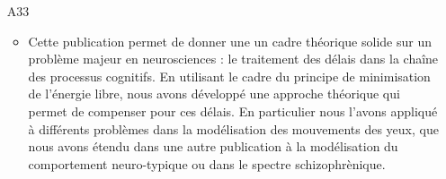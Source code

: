 \begin{enumerate}
\item[A33]  %
\begin{itemize}
  \item Cette publication permet de donner une un cadre théorique solide sur un problème majeur en neurosciences : le traitement des délais dans la chaîne des processus cognitifs. En utilisant le cadre du principe de minimisation de l'énergie libre, nous avons développé une approche théorique qui permet de compenser pour ces délais. En particulier nous l'avons appliqué à différents problèmes dans la modélisation des mouvements des yeux, que nous avons étendu dans une autre publication à la modélisation du comportement neuro-typique ou dans le spectre schizophrènique.
\end{itemize}
%
%
%
%
%
%
%
%
%
%
%
%
%
%
%
%
%
%

\end{enumerate}
